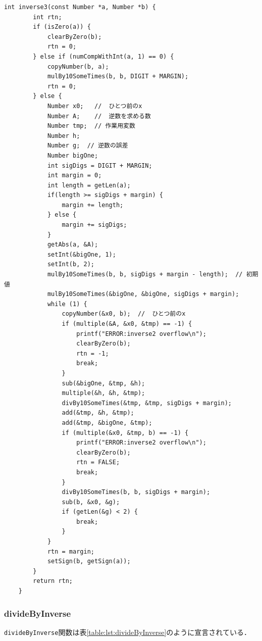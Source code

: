 \documentclass[a4paper,11pt,dvipdfmx]{jsarticle}
\begin{document}
\begin{lstlisting}[caption=\texttt{inverse3}関数,label=lst:inverse3src]
    int inverse3(const Number *a, Number *b) {
        int rtn;
        if (isZero(a)) {
            clearByZero(b);
            rtn = 0;
        } else if (numCompWithInt(a, 1) == 0) {
            copyNumber(b, a);
            mulBy10SomeTimes(b, b, DIGIT + MARGIN);
            rtn = 0;
        } else {
            Number x0;   //  ひとつ前のx
            Number A;    //  逆数を求める数
            Number tmp;  // 作業用変数
            Number h;
            Number g;  // 逆数の誤差
            Number bigOne;
            int sigDigs = DIGIT + MARGIN;
            int margin = 0;
            int length = getLen(a);
            if(length >= sigDigs + margin) {
                margin += length;
            } else {
                margin += sigDigs;
            }
            getAbs(a, &A);
            setInt(&bigOne, 1);
            setInt(b, 2);
            mulBy10SomeTimes(b, b, sigDigs + margin - length);  // 初期値
            mulBy10SomeTimes(&bigOne, &bigOne, sigDigs + margin);
            while (1) {
                copyNumber(&x0, b);  //  ひとつ前のx
                if (multiple(&A, &x0, &tmp) == -1) {
                    printf("ERROR:inverse2 overflow\n");
                    clearByZero(b);
                    rtn = -1;
                    break;
                }
                sub(&bigOne, &tmp, &h);
                multiple(&h, &h, &tmp);
                divBy10SomeTimes(&tmp, &tmp, sigDigs + margin);
                add(&tmp, &h, &tmp);
                add(&tmp, &bigOne, &tmp);
                if (multiple(&x0, &tmp, b) == -1) {
                    printf("ERROR:inverse2 overflow\n");
                    clearByZero(b);
                    rtn = FALSE;
                    break;
                }
                divBy10SomeTimes(b, b, sigDigs + margin);
                sub(b, &x0, &g);
                if (getLen(&g) < 2) {
                    break;
                }
            }
            rtn = margin;
            setSign(b, getSign(a));
        }
        return rtn;
    }
\end{lstlisting}

\subsubsection{divideByInverse}
\texttt{divideByInverse}関数は表\ref{table:lst:divideByInverse}のように宣言されている．
\end{document}
